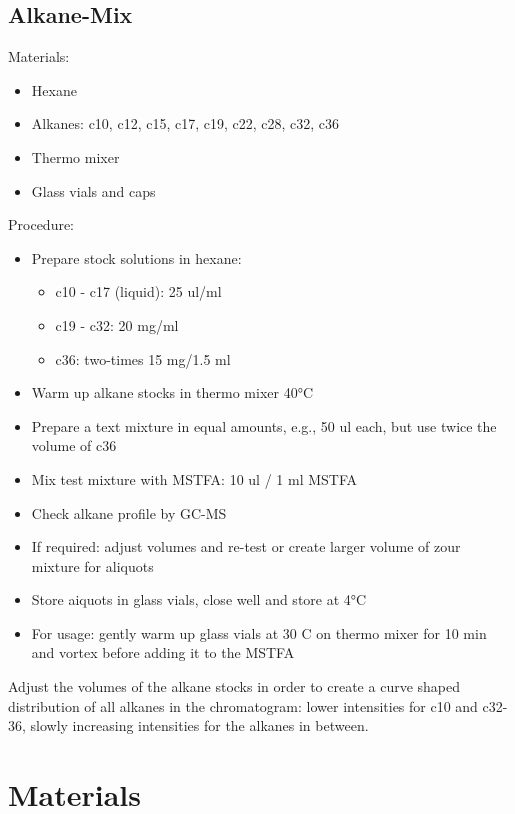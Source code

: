 \documentclass[]{book}
\providecommand{\tightlist}{%
  \setlength{\itemsep}{0pt}\setlength{\parskip}{0pt}}
\begin{document}
\hypertarget{alkanemix}{%
\subsection{Alkane-Mix}\label{alkanemix}}

Materials:

\begin{itemize}
\tightlist
\item
  Hexane
\item
  Alkanes: c10, c12, c15, c17, c19, c22, c28, c32, c36
\item
  Thermo mixer
\item
  Glass vials and caps
\end{itemize}

Procedure:

\begin{itemize}
\tightlist
\item
  Prepare stock solutions in hexane:

  \begin{itemize}
  \tightlist
  \item
    c10 - c17 (liquid): 25 ul/ml
  \item
    c19 - c32: 20 mg/ml
  \item
    c36: two-times 15 mg/1.5 ml
  \end{itemize}
\item
  Warm up alkane stocks in thermo mixer 40°C
\item
  Prepare a text mixture in equal amounts, e.g., 50 ul each, but use twice the volume of c36
\item
  Mix test mixture with MSTFA: 10 ul / 1 ml MSTFA
\item
  Check alkane profile by GC-MS
\item
  If required: adjust volumes and re-test or create larger volume of zour mixture for aliquots
\item
  Store aiquots in glass vials, close well and store at 4°C
\item
  For usage: gently warm up glass vials at 30 C on thermo mixer for 10 min and vortex before adding it to the MSTFA
\end{itemize}

Adjust the volumes of the alkane stocks in order to create a curve shaped distribution of all alkanes in the chromatogram: lower intensities for c10 and c32-36, slowly increasing intensities for the alkanes in between.

\hypertarget{materials-1}{%
\section{Materials}\label{materials-1}}
\end{document}
